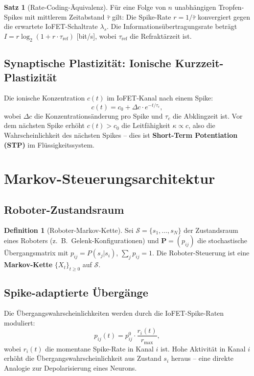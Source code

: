 ﻿\documentclass[a4paper,12pt]{scrreprt}
\theoremstyle{definition}
\newtheorem{definition}{Definition}[section]
\newtheorem{satz}{Satz}[section]
\newcommand{\matr}[1]{\mathbf{#1}}
\begin{document}
\begin{satz}[Rate-Coding-Äquivalenz]
  Für eine Folge von $n$ unabhängigen Tropfen-Spikes mit mittlerem
  Zeitabstand $\bar\tau$ gilt: Die Spike-Rate $r = 1/\bar\tau$
  konvergiert gegen die erwartete IoFET-Schaltrate $\lambda_s$.
  Die Informationsübertragungsrate beträgt
  $I = r \log_2(1 + r \cdot \tau_{\mathrm{ref}})$ [bit/s],
  wobei $\tau_{\mathrm{ref}}$ die Refraktärzeit ist.
\end{satz}

\subsection{Synaptische Plastizität: Ionische Kurzzeit-Plastizität}

Die ionische Konzentration $c(t)$ im IoFET-Kanal nach einem Spike:
\[
  c(t) = c_0 + \Delta c \cdot e^{-t/\tau_c},
\]
wobei $\Delta c$ die Konzentrationsänderung pro Spike und $\tau_c$
die Abklingzeit ist. Vor dem nächsten Spike erhöht $c(t) > c_0$ die
Leitfähigkeit $\kappa \propto c$, also die Wahrscheinlichkeit des
nächsten Spikes -- dies ist \textbf{Short-Term Potentiation (STP)}
im Flüssigkeitssystem.

\section{Markov-Steuerungsarchitektur}

\subsection{Roboter-Zustandsraum}

\begin{definition}[Roboter-Markov-Kette]
  Sei $\mathcal{S} = \{s_1,\ldots,s_N\}$ der Zustandsraum eines
  Roboters (z.\ B.\ Gelenk-Konfigurationen) und
  $\matr{P} = (p_{ij})$ die stochastische Übergangsmatrix mit
  $p_{ij} = P(s_{j}|s_i)$, $\sum_j p_{ij} = 1$. Die Roboter-Steuerung
  ist eine \textbf{Markov-Kette} $\{X_t\}_{t\geq 0}$ auf $\mathcal{S}$.
\end{definition}

\subsection{Spike-adaptierte Übergänge}

Die Übergangswahrscheinlichkeiten werden durch die IoFET-Spike-Raten
moduliert:
\[
  p_{ij}(t) = p_{ij}^0 \cdot \frac{r_i(t)}{r_{\max}},
\]
wobei $r_i(t)$ die momentane Spike-Rate in Kanal $i$ ist. Hohe
Aktivität in Kanal $i$ erhöht die Übergangswahrscheinlichkeit aus
Zustand $s_i$ heraus -- eine direkte Analogie zur Depolarisierung
eines Neurons.
\end{document}
